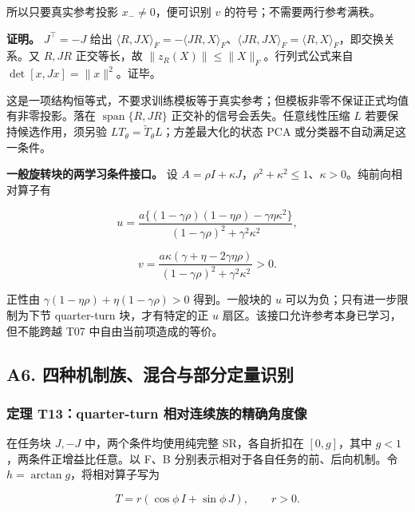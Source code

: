 \documentclass[11pt,a4paper]{article}
\begin{document}
所以只要真实参考投影 \(x_-\ne0\)，便可识别 \(v\)
的符号；不需要两行参考满秩。

\textbf{证明。} \(J^\top=-J\) 给出
\(\langle R,JX\rangle_F=-\langle JR,X\rangle_F\)、\(\langle JR,JX\rangle_F=\langle R,X\rangle_F\)，即交换关系。又
\(R,JR\) 正交等长，故 \(\|z_R(X)\|\le\|X\|_F\)。行列式公式来自
\(\det[x,Jx]=\|x\|^2\)。证毕。

这是一项结构恒等式，不要求训练模板等于真实参考；但模板非零不保证正式均值有非零投影。落在
\(\operatorname{span}\{R,JR\}\) 正交补的信号会丢失。任意线性压缩 \(L\)
若要保持候选作用，须另验
\(LT_\theta=\widetilde T_\theta L\)；方差最大化的状态 PCA
或分类器不自动满足这一条件。

\par
\noindent\begin{minipage}{\linewidth}

\textbf{一般旋转块的两学习条件接口。} 设
\(A=\rho I+\kappa J\)，\(\rho^2+\kappa^2\le1\)、\(\kappa>0\)。纯前向相对算子有

\[
u=\frac{a\{(1-\gamma\rho)(1-\eta\rho)-\gamma\eta\kappa^2\}}
{(1-\gamma\rho)^2+\gamma^2\kappa^2},
\]

\end{minipage}\par

\[
v=\frac{a\kappa(\gamma+\eta-2\gamma\eta\rho)}
{(1-\gamma\rho)^2+\gamma^2\kappa^2}>0.
\]

正性由 \(\gamma(1-\eta\rho)+\eta(1-\gamma\rho)>0\) 得到。一般块的 \(u\)
可以为负；只有进一步限制为下节 quarter-turn 块，才有特定的正 \(u\)
扇区。该接口允许参考本身已学习，但不能跨越 T07 中自由当前项造成的等价。

\subsection{A6.
四种机制族、混合与部分定量识别}\label{a6.-ux56dbux79cdux673aux5236ux65cfux6df7ux5408ux4e0eux90e8ux5206ux5b9aux91cfux8bc6ux522b}

\subsubsection{定理 T13：quarter-turn
相对连续族的精确角度像}\label{ux5b9aux7406-t13quarter-turn-ux76f8ux5bf9ux8fdeux7eedux65cfux7684ux7cbeux786eux89d2ux5ea6ux50cf}

\par
\noindent\begin{minipage}{\linewidth}

在任务块 \(J,-J\) 中，两个条件均使用纯完整 SR，各自折扣在
\([0,g]\)，其中 \(g<1\)，两条件正增益比任意。以 F、B
分别表示相对于各自任务的前、后向机制。令 \(h=\arctan g\)，将相对算子写为

\[
T=r(\cos\phi\,I+\sin\phi\,J),\qquad r>0.
\]

\end{minipage}\par
\end{document}
